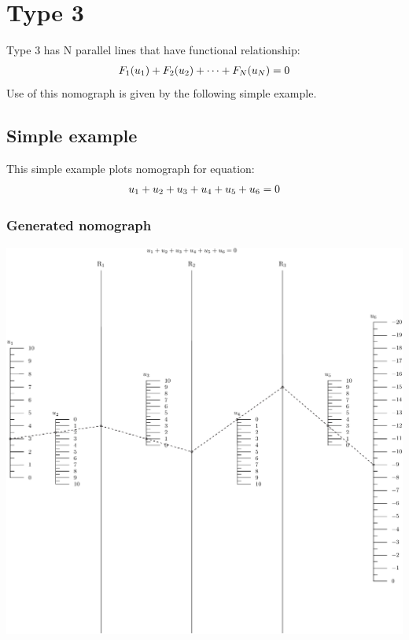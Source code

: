 \documentclass[a4paper,11pt,english]{sphinxmanual}
\begin{document}
\section{Type 3}
\label{types/types:type3-ref}\label{types/types:type-3}
Type 3 has N parallel lines that have functional relationship:
\begin{gather}
\begin{split}F_1(u_1) + F_2(u_2) + \cdots + F_N(u_N) = 0\end{split}\notag
\end{gather}
Use of this nomograph is given by the following
simple example.


\subsection{Simple example}
\label{types/types:id6}
This simple example plots nomograph for equation:
\begin{gather}
\begin{split}u_1 + u_2 + u_3 + u_4 + u_5 + u_6 = 0\end{split}\notag
\end{gather}

\subsubsection{Generated nomograph}
\label{types/types:id7}
\includegraphics{ex_type3_nomo_1.pdf}
\end{document}
